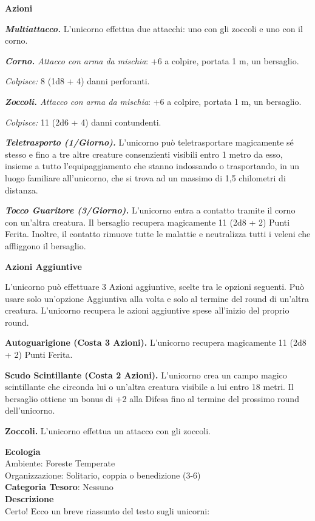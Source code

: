 \begin{multicols}{2}
{\textbf{Azioni}

\emph{\textbf{Multiattacco.}} L'unicorno effettua due attacchi: uno con gli zoccoli e uno con il corno.

\emph{\textbf{Corno.} Attacco con arma da mischia}: +6 a colpire, portata 1 m, un bersaglio.

\emph{Colpisce:} 8 (1d8 + 4) danni perforanti.

\emph{\textbf{Zoccoli.} Attacco con arma da mischia}: +6 a colpire, portata 1 m, un bersaglio.

\emph{Colpisce:} 11 (2d6 + 4) danni contundenti.

\emph{\textbf{Teletrasporto (1/Giorno).}} L'unicorno può teletrasportare magicamente sé stesso e fino a tre altre creature consenzienti visibili entro 1 metro da esso, insieme a tutto l'equipaggiamento che stanno indossando o trasportando, in un luogo familiare all'unicorno, che si trova ad un massimo di 1,5 chilometri di distanza.

\emph{\textbf{Tocco Guaritore (3/Giorno).}} L'unicorno entra a contatto tramite il corno con un'altra creatura. Il bersaglio recupera magicamente 11 (2d8 + 2) Punti Ferita. Inoltre, il contatto rimuove tutte le malattie e neutralizza tutti i veleni che affliggono il bersaglio.

\textbf{Azioni Aggiuntive}

L'unicorno può effettuare 3 Azioni aggiuntive, scelte tra le opzioni seguenti. Può usare solo un'opzione Aggiuntiva alla volta e solo al termine del round di un'altra creatura. L'unicorno recupera le azioni aggiuntive spese all'inizio del proprio round.

\textbf{Autoguarigione (Costa 3 Azioni).} L'unicorno recupera magicamente 11 (2d8 + 2) Punti Ferita.

\textbf{Scudo Scintillante (Costa 2 Azioni).} L'unicorno crea un campo magico scintillante che circonda lui o un'altra creatura visibile a lui entro 18 metri. Il bersaglio ottiene un bonus di +2 alla Difesa fino al termine del prossimo round dell'unicorno.

\textbf{Zoccoli.} L'unicorno effettua un attacco con gli zoccoli.

\textbf{Ecologia}\\
Ambiente: Foreste Temperate\\
Organizzazione: Solitario, coppia o benedizione (3-6)\\
\textbf{Categoria Tesoro}: Nessuno\\
\textbf{Descrizione}\\
Certo! Ecco un breve riassunto del testo sugli unicorni:

}
\end{multicols}
